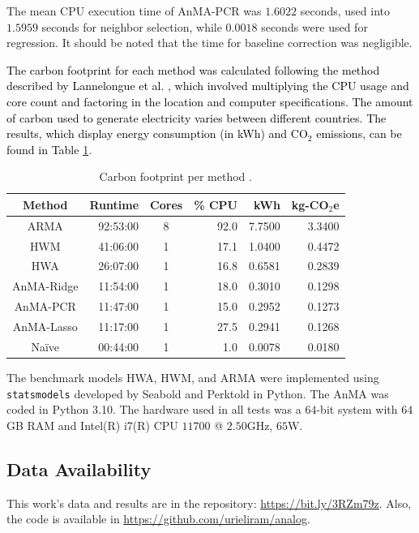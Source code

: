 \documentclass[journal, twoside]{IEEEtran}
\begin{document}
The mean CPU execution time of AnMA-PCR was $1.6022$ seconds, used into $1.5959$ seconds for neighbor selection, while $0.0018$ seconds were used for regression. It should be noted that the time for baseline correction was negligible.


\textcolor{black}{The carbon footprint for each method was calculated following the method described by Lannelongue et al. \cite{Lannelongue2021}, which involved multiplying the CPU usage and core count and factoring in the location and computer specifications. The amount of carbon used to generate electricity varies between different countries. The results, which display energy consumption (in kWh) and CO$_{2}$ emissions, can be found in Table }\ref{tab:footprint}.
\begin{table}
\centering
\caption{Carbon footprint per method \cite{Lannelongue2021}.}
\label{tab:footprint}
\footnotesize
\begin{tabular}{crcrrr}
\hline
Method      & Runtime  & Cores & \% CPU & kWh    & kg-CO$_2$e  \\ \hline
ARMA        & 92:53:00 & 8     & 92.0   & 7.7500 & 3.3400   \\ 
HWM         & 41:06:00 & 1     & 17.1   & 1.0400 & 0.4472   \\ 
HWA         & 26:07:00 & 1     & 16.8   & 0.6581 & 0.2839   \\ 
AnMA-Ridge  & 11:54:00 & 1     & 18.0   & 0.3010 & 0.1298   \\ 
AnMA-PCR    & 11:47:00 & 1     & 15.0   & 0.2952 &  0.1273  \\ 
AnMA-Lasso  & 11:17:00 & 1     & 27.5   & 0.2941 & 0.1268   \\ 
Naïve       & 00:44:00 & 1     &  1.0   & 0.0078 & 0.0180   \\  \hline 
\end{tabular}
\end{table}



The benchmark models \ac{HWA}, \ac{HWM}, and \ac{ARMA} were
implemented using \texttt{statsmodels} developed by Seabold and
Perktold \cite{seabold2010statsmodels} in Python. The \ac{AnMA} was coded in Python 3.10. The hardware used in all tests was a $64$-bit system with $64$GB RAM and Intel(R) i7(R) CPU $11700$ @ $2.50$GHz, $65$W.


\subsection{Data Availability}
\begin{sloppypar}
This work's data and results are in the repository: \url{https://bit.ly/3RZm79z}. Also, the code is available in \url{https://github.com/urieliram/analog}. %
\end{sloppypar}
\end{document}
